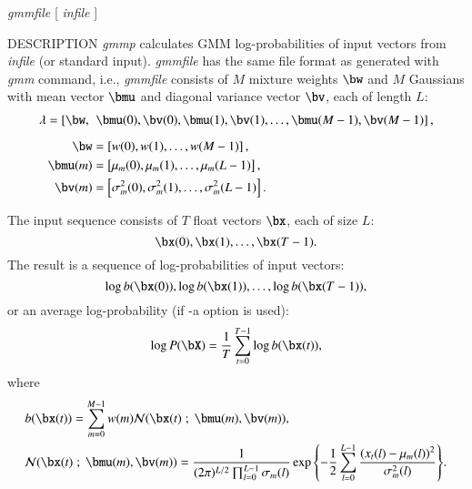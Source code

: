 \begin{synopsis}
\item [gmmp] [ --l $L$ ] [ --m $M$ ] [ --a ] {\em gmmfile} [ {\em infile} ]
\end{synopsis}

\begin{qsection}{DESCRIPTION}
{\em gmmp} calculates GMM log-probabilities of input vectors from {\em
infile} (or standard input). 
{\em gmmfile} has the same file format as generated with {\em gmm} command, 
i.e., {\em gmmfile} consists of $M$ mixture weights
$\bw$ and $M$ Gaussians with mean vector $\bmu$ and diagonal variance vector
$\bv$, each of length $L$:
\begin{align}
 \lambda =
 \left[\bw,\right.&\left.\bmu(0),\bv(0), \bmu(1), \bv(1),
 \ldots, \bmu(M-1), \bv(M-1)\right],\notag\\[2mm]
 \bw &=\left[ w(0), w(1), \ldots, w(M-1) \right],\notag\\
 \bmu(m) &=\left[\mu_m(0), \mu_m(1), \ldots, \mu_m(L-1)\right],\notag\\
 \bv(m) &=\left[\sigma_m^2(0), \sigma_m^2(1), \ldots,
 \sigma_m^2(L-1)\right].\notag
\end{align}


The input sequence consists of $T$ float vectors $\bx$, each of
size $L$:
\begin{displaymath}
 \bx(0), \bx(1), \dots, \bx(T-1).
\end{displaymath}
The result is a sequence of log-probabilities of input vectors:
\begin{displaymath}
 \log b(\bx(0)), \log b(\bx(1)), \ldots, \log b(\bx(T-1)),
\end{displaymath}
or an average log-probability (if -a option is used):
\begin{displaymath}
 \log P(\bX) = \frac{1}{T}\sum_{t=0}^{T-1}\log b(\bx(t)),
\end{displaymath}
where
\begin{align}
 &b(\bx(t)) =\sum_{m=0}^{M-1}
 w(m){\cal N}(\bx(t) \; ; \; \bmu(m),\bv(m)),\notag\\
 &{\cal N}(\bx(t) \; ; \; \bmu(m),\bv(m))%
  =\frac{1}{(2\pi)^{L/2}\prod_{l=0}^{L-1}\sigma_m(l)}%
  \exp{\left\{-\frac{1}{2}%
    \sum_{l=0}^{L-1}
    \frac{\left(x_t(l)-\mu_m(l)\right)^2}%
    {\sigma_m^2(l)}\right\}}.\notag
\end{align}

\end{qsection}

\begin{options}
\end{options}

